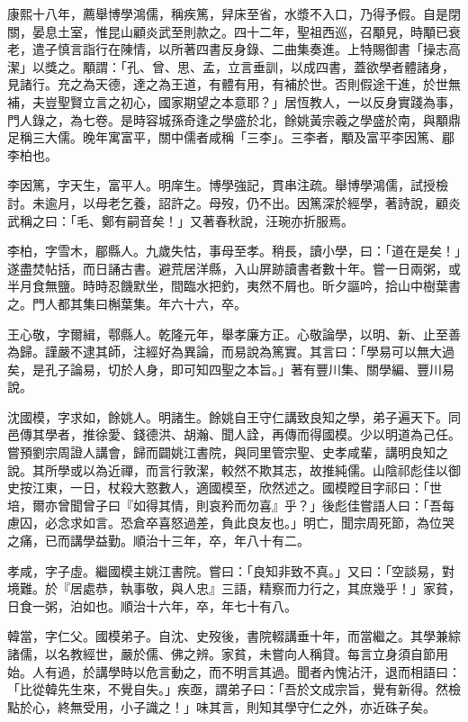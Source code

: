 \begin{pinyinscope}
康熙十八年，薦舉博學鴻儒，稱疾篤，舁床至省，水漿不入口，乃得予假。自是閉關，晏息土室，惟昆山顧炎武至則款之。四十二年，聖祖西巡，召顒見，時顒已衰老，遣子慎言詣行在陳情，以所著四書反身錄、二曲集奏進。上特賜御書「操志高潔」以獎之。顒謂：「孔、曾、思、孟，立言垂訓，以成四書，蓋欲學者體諸身，見諸行。充之為天德，達之為王道，有體有用，有補於世。否則假途干進，於世無補，夫豈聖賢立言之初心，國家期望之本意耶？」居恆教人，一以反身實踐為事，門人錄之，為七卷。是時容城孫奇逢之學盛於北，餘姚黃宗羲之學盛於南，與顒鼎足稱三大儒。晚年寓富平，關中儒者咸稱「三李」。三李者，顒及富平李因篤、郿李柏也。

李因篤，字天生，富平人。明庠生。博學強記，貫串注疏。舉博學鴻儒，試授檢討。未逾月，以母老乞養，詔許之。母歿，仍不出。因篤深於經學，著詩說，顧炎武稱之曰：「毛、鄭有嗣音矣！」又著春秋說，汪琬亦折服焉。

李柏，字雪木，郿縣人。九歲失怙，事母至孝。稍長，讀小學，曰：「道在是矣！」遂盡焚帖括，而日誦古書。避荒居洋縣，入山屏跡讀書者數十年。嘗一日兩粥，或半月食無鹽。時時忍饑默坐，間臨水把釣，夷然不屑也。昕夕謳吟，拾山中樹葉書之。門人都其集曰槲葉集。年六十六，卒。

王心敬，字爾緝，鄠縣人。乾隆元年，舉孝廉方正。心敬論學，以明、新、止至善為歸。謹嚴不逮其師，注經好為異論，而易說為篤實。其言曰：「學易可以無大過矣，是孔子論易，切於人身，即可知四聖之本旨。」著有豐川集、關學編、豐川易說。

沈國模，字求如，餘姚人。明諸生。餘姚自王守仁講致良知之學，弟子遍天下。同邑傳其學者，推徐愛、錢德洪、胡瀚、聞人詮，再傳而得國模。少以明道為己任。嘗預劉宗周證人講會，歸而闢姚江書院，與同里管宗聖、史孝咸輩，講明良知之說。其所學或以為近禪，而言行敦潔，較然不欺其志，故推純儒。山陰祁彪佳以御史按江東，一日，杖殺大憝數人，適國模至，欣然述之。國模瞠目字祁曰：「世培，爾亦曾聞曾子曰『如得其情，則哀矜而勿喜』乎？」後彪佳嘗語人曰：「吾每慮囚，必念求如言。恐倉卒喜怒過差，負此良友也。」明亡，聞宗周死節，為位哭之痛，已而講學益勤。順治十三年，卒，年八十有二。

孝咸，字子虛。繼國模主姚江書院。嘗曰：「良知非致不真。」又曰：「空談易，對境難。於『居處恭，執事敬，與人忠』三語，精察而力行之，其庶幾乎！」家貧，日食一粥，泊如也。順治十六年，卒，年七十有八。

韓當，字仁父。國模弟子。自沈、史歿後，書院輟講垂十年，而當繼之。其學兼綜諸儒，以名教經世，嚴於儒、佛之辨。家貧，未嘗向人稱貸。每言立身須自節用始。人有過，於講學時以危言動之，而不明言其過。聞者內愧沾汗，退而相語曰：「比從韓先生來，不覺自失。」疾亟，謂弟子曰：「吾於文成宗旨，覺有新得。然檢點於心，終無受用，小子識之！」味其言，則知其學守仁之外，亦近硃子矣。


\end{pinyinscope}
